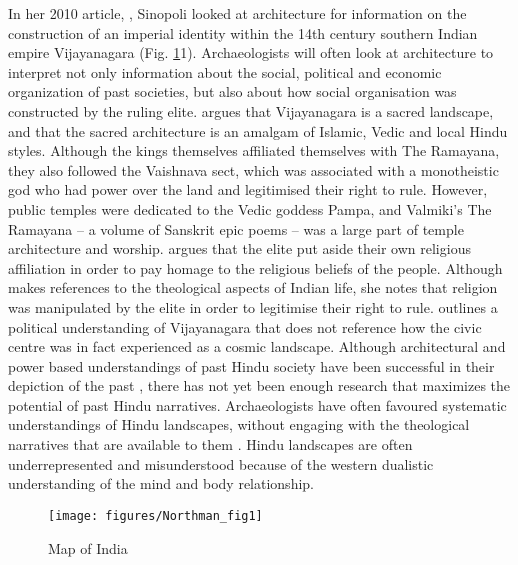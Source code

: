 	In her  2010 article, , Sinopoli looked at architecture for information on the construction of an imperial identity within the 14th century southern Indian empire Vijayanagara (Fig. \ref {fig:Northman_fig1}1). Archaeologists will often look at architecture to interpret not only information about the social, political and economic organization of past societies, but also about how social organisation was constructed by the ruling elite\parencite [222]{RenfrewBahn_2012}. \textcite {Sinopoli_2010} argues that Vijayanagara is a sacred landscape, and that the sacred architecture is an amalgam of Islamic, Vedic and local Hindu styles. Although the kings themselves affiliated themselves with The Ramayana, they also followed the Vaishnava sect, which was associated with a monotheistic god who had power over the land and legitimised their right to rule. However, public temples were dedicated to the Vedic goddess Pampa, and Valmiki’s The Ramayana -- a volume of Sanskrit epic poems -- was a large part of temple architecture and worship. \textcite[457] {Sinopoli_2010}  argues that the elite put aside their own religious affiliation in order to pay homage to the religious beliefs of the people. Although \textcite {Sinopoli_2010}makes references to the theological aspects of Indian life, she notes that religion was manipulated by the elite in order to legitimise their right to rule.\textcite {Sinopoli_2010}  outlines a political understanding of Vijayanagara that does not reference how the civic centre was in fact experienced as a cosmic landscape. Although architectural and power based understandings of past Hindu society have been successful in their depiction of the past \parencites{Fritz_1986}{Mack_2004}{Sinopoli_2010}, there has not yet been enough research that maximizes the potential of past Hindu narratives. Archaeologists have often favoured systematic understandings of Hindu landscapes, without engaging with the theological narratives that are available to them \parencite {Sugandhi_2011}. Hindu landscapes are often underrepresented and misunderstood because of the western dualistic understanding of the mind and body relationship.
	
\begin{figure}[!htb]
\texttt{[image: figures/Northman\_fig1]}
\caption{Map of India}
\label{fig:Northman_fig1}
\end{figure}
	 
